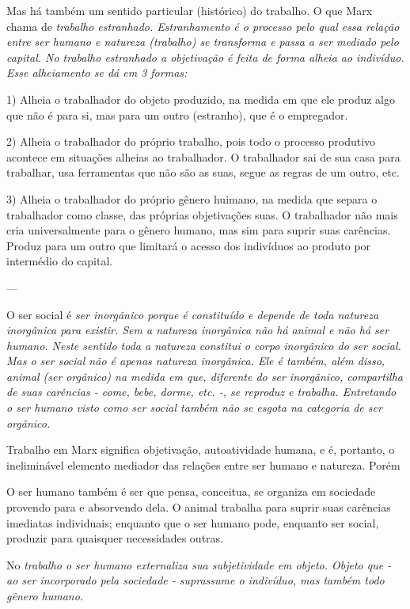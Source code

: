 \documentclass[12pt]{article}
\begin{document}
Mas há também um sentido particular (histórico) do trabalho.
O que Marx chama de \em trabalho estranhado\em.
\em Estranhamento \em é o processo pelo qual essa relação entre ser humano e natureza (trabalho) se transforma e passa a ser mediado pelo capital.
No trabalho estranhado a objetivação é feita de forma alheia ao indivíduo.
Esse alheiamento se dá em 3 formas:

1) Alheia o trabalhador do objeto produzido, na medida em que ele produz algo que não é para si, mas para um outro (estranho), que é o empregador.

2) Alheia o trabalhador do próprio trabalho, pois todo o processo produtivo acontece em situações alheias ao trabalhador.
O trabalhador sai de sua casa para trabalhar, usa ferramentas que não são as suas, segue as regras de um outro, etc.

3) Alheia o trabalhador do próprio gênero huimano, na medida que separa o trabalhador como classe, das próprias objetivações suas. O trabalhador não mais cria universalmente para o gênero humano, mas sim para suprir suas carências. Produz para um outro que limitará o acesso dos indivíduos ao produto por intermédio do capital.




\newpage
---


O ser social é \em ser inorgânico \em porque é constituído e depende de toda natureza inorgânica para existir.
Sem a natureza inorgânica não há animal e não há ser humano.
Neste sentido toda a natureza constitui o corpo inorgânico do ser social.
Mas o ser social não é apenas natureza inorgânica.
Ele é também, além disso, \em animal \em (ser orgânico) na medida em que, diferente do ser inorgânico, compartilha de suas carências - come, bebe, dorme, etc. -, se reproduz e \em trabalha\em.
Entretando o ser humano visto como ser social também não se esgota na categoria de ser orgânico.

Trabalho em Marx significa objetivação, autoatividade humana, e é, portanto, o ineliminável elemento mediador das relações entre ser humano e natureza.
Porém

O ser humano também é ser que pensa, conceitua, se organiza em sociedade provendo para e absorvendo dela.
O animal trabalha para suprir suas carências imediatas individuais; enquanto que o ser humano pode, enquanto ser social, produzir para quaisquer necessidades outras.

No \em trabalho \em o ser humano externaliza sua subjetividade em objeto.
Objeto que - ao ser incorporado pela sociedade - suprassume o indivíduo, mas também todo gênero humano.
\end{document}
